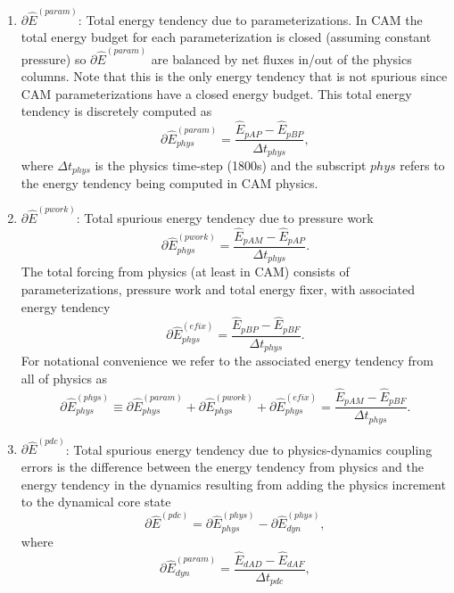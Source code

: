 \documentclass{agujournal}
\newcommand*{\gi}[1]{\widehat{#1}}
\begin{document}
\begin{enumerate}
%
\item $\partial \gi{E}^{(param)}$: Total energy tendency due to parameterizations. In CAM the total energy budget for each parameterization is closed (assuming constant pressure) so $\partial \gi{E}^{(param)}$ are balanced by net fluxes in/out of the physics columns. Note that this is the only energy tendency that is not spurious since CAM parameterizations have a closed energy budget. This total energy tendency is discretely computed as
\begin{equation}
\partial \gi{E}_{phys}^{({param})}=\frac{\gi{E}_{pAP}-\gi{E}_{pBP}}{\Delta t_{phys}},
\end{equation}
where $\Delta t_{phys}$ is the physics time-step (1800s) and the subscript $phys$ refers to the energy tendency being computed in CAM physics. 
%
\item $\partial \gi{E}^{({pwork})}$: Total spurious energy tendency due to pressure work
\begin{equation}
\partial \gi{E}_{phys}^{({pwork})}=\frac{\gi{E}_{pAM}-\gi{E}_{pAP}}{\Delta t_{phys}}.
\end{equation}
The total forcing from physics (at least in CAM) consists of parameterizations, pressure work and total energy fixer, with associated energy tendency
\begin{equation}
\partial \gi{E}_{phys}^{({efix})}=\frac{\gi{E}_{pBP}-\gi{E}_{pBF}}{\Delta t_{phys}}.
\end{equation}
For notational convenience we refer to the associated energy tendency from all of physics as
\begin{equation}
\partial \gi{E}_{phys}^{({phys})}\equiv \partial \gi{E}_{phys}^{({param})}+\partial \gi{E}_{phys}^{({pwork})}+\partial \gi{E}_{phys}^{({efix})}=\frac{\gi{E}_{pAM}-\gi{E}_{pBF}}{\Delta t_{phys}}.
\end{equation}
%
\item $\partial \gi{E}^{({pdc})}$: Total spurious energy tendency due to physics-dynamics coupling errors is the difference between the energy tendency from physics and the energy tendency in the dynamics resulting from adding the physics increment to the dynamical core state
\begin{equation}
\partial \gi{E}^{({pdc})}=\partial \gi{E}_{phys}^{({phys})}-\partial \gi{E}_{dyn}^{({phys})},
\end{equation}
where
\begin{equation}
\partial \gi{E}_{dyn}^{({param})}=\frac{\gi{E}_{dAD}-\gi{E}_{dAF}}{\Delta t_{pdc}},

\end{equation}
\end{enumerate}
\end{document}
